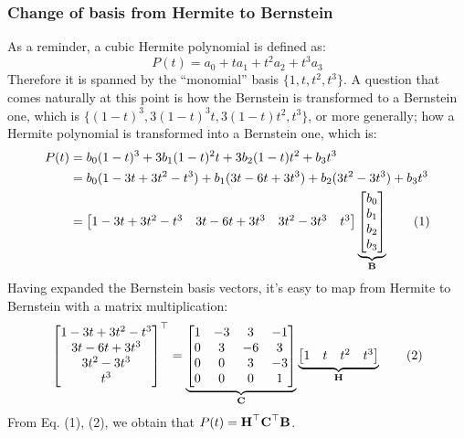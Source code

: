 \documentclass[a4paper]{article}
\begin{document}
\subsubsection{Change of basis from Hermite to Bernstein}
As a reminder, a cubic Hermite polynomial is defined as:
\[
    P(t) = a_0 + ta_1 + t^2a_2 + t^3a_3
\]
Therefore it is spanned by the ``monomial'' basis $\{1,t,t^2,t^3\}$.
A question that comes naturally at this point is how the Bernstein is transformed to a Bernstein one, which is $\{(1-t)^3, 3(1-t)^3t, 3(1-t)t^2, t^3\}$, or more generally; how a Hermite polynomial is transformed into a Bernstein one, which is:
\begin{align*}
    P(t) &= b_0(1-t)^3 + 3b_1(1-t)^2t + 3b_2(1-t)t^2 + b_3t^3 \\
    &= b_0(1-3t+3t^2-t^3) + b_1(3t-6t + 3t^3) + b_2(3t^2 - 3t^3) + b_3t^3 \\
    &=  \begin{bmatrix}1-3t+3t^2-t^3 & 3t-6t + 3t^3 & 3t^2 - 3t^3 & t^3\end{bmatrix}
        \underbrace{
            \begin{bmatrix}
                b_0 \\ b_1 \\ b_2 \\ b_3 
            \end{bmatrix}
        }_{\textbf{B}}
    \tag{1}
\end{align*}
Having expanded the Bernstein basis vectors, it's easy to map from Hermite to Bernstein with a matrix multiplication:
\[
   \begin{bmatrix}1-3t+3t^2-t^3 \\ 3t-6t + 3t^3 \\ 3t^2 - 3t^3 \\ t^3\end{bmatrix}^{\top} = 
        \underbrace{
            \begin{bmatrix}
                1 & -3 & 3 & -1 \\
                0 & 3 & -6 & 3 \\
                0 & 0 & 3 & -3 \\ 
                0 & 0 & 0 & 1
            \end{bmatrix}
        }_{\textbf{C}}
        \underbrace{
            \begin{bmatrix}
                1 & t & t^2 & t^3 
            \end{bmatrix}
        }_{\textbf{H}}
        \tag{2}
\]
From Eq. (1), (2), we obtain that $P(t) = \textbf{H}^{\top}\textbf{C}^{\top}\textbf{B}$.
\end{document}
